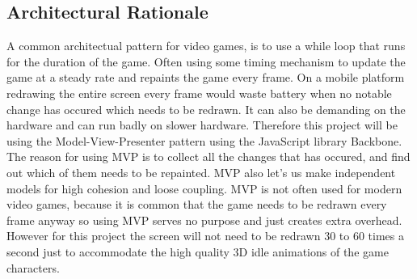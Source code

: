 \subsection{Architectural Rationale}

A common architectual pattern for video games, is to use a while loop that runs for the duration 
of the game. Often using some timing mechanism to update the game at a steady rate and repaints 
the game every frame. On a mobile platform redrawing the entire screen every frame would waste 
battery when no notable change has occured which needs to be redrawn. It can also be demanding 
on the hardware and can run badly on slower hardware. Therefore this project will be using the 
Model-View-Presenter pattern using the JavaScript library Backbone. The reason for using MVP is 
to collect all the changes that has occured, and find out which of them needs to be repainted. 
MVP also let's us make independent models for high cohesion and loose coupling. MVP is not often 
used for modern video games, because it is common that the game needs to be redrawn every frame 
anyway so using MVP serves no purpose and just creates extra overhead. However for this project 
the screen will not need to be redrawn 30 to 60 times a second just to accommodate the high quality 
3D idle animations of the game characters.
